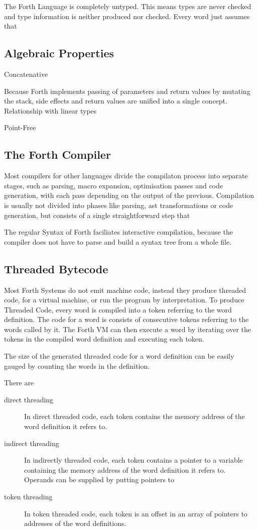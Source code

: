 \documentclass{llncs}
\begin{document}
The Forth Language is completely untyped. This means types are never checked and type information is neither produced nor checked. Every word just assumes that


\subsection{Algebraic Properties}

Concatenative

Because Forth implements passing of parameters and return values by mutating the stack, side effects and return values are unified into a single concept.
Relationship with linear types

Point-Free


\subsection{The Forth Compiler}

Most compilers for other languages divide the compilaton process into separate stages, such as parsing, macro expansion, optimisation passes and code generation, with each pass depending on the output of the previous. Compilation is usually not divided into phases like parsing, ast transformations or code generation, but consists of a single straightforward step that 

The regular Syntax of Forth faciliates interactive compilation, because the compiler does not have to parse and build a syntax tree from a whole file. 


\subsection{Threaded Bytecode}

Most Forth Systems do not emit machine code, instead they produce threaded code, for a virtual machine, or run the program by interpretation.
To produce Threaded Code, every word is compiled into a token referring to the word definition. The code for a word is consists of consecutive tokens referring to the words called by it. The Forth VM can then execute a word by iterating over the tokens in the compiled word definition and executing each token.

The size of the generated threaded code for a word definition can be easily gauged by counting the words in the definition.

There are 

\begin{description}
\item[direct threading] 
  In direct threaded code, each token contains the memory address of the word definition it refers to. 
\item[indirect threading] 
  In indirectly threaded code, each token contains a pointer to a variable containing the memory address of the word definition it refers to. Operands can be supplied by putting pointers to 
\item[token threading] 
  In token threaded code, each token is an offset in an array of pointers to addresses of the word definitions.
\end{description}
 
\end{document}
